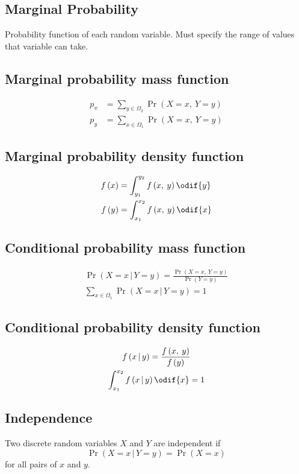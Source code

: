 \documentclass{article}
\begin{document}
\begin{multicols}{3}
    \subsection{Marginal Probability}
    Probability function of each random variable.
    Must specify the range of values that variable can take.
    \subsection{Marginal probability mass function}
    \begin{align*}
        p_x & = \sum_{y \in \Omega_2} \Pr{\left( X = x,\: Y = y \right)} \\
        p_y & = \sum_{x \in \Omega_1} \Pr{\left( X = x,\: Y = y \right)}
    \end{align*}
    \subsection{Marginal probability density function}
    \begin{align*}
        f\left( x \right) & = \int_{y_1}^{y_2} f\left( x,\: y \right) \odif{y} \\
        f\left( y \right) & = \int_{x_1}^{x_2} f\left( x,\: y \right) \odif{x}
    \end{align*}
    \subsection{Conditional probability mass function}
    \begin{gather*}
        \Pr{\left( X = x \,\vert\, Y = y \right)} = \frac{\Pr{\left( X = x,\: Y = y \right)}}{\Pr{\left( Y = y \right)}} \\
        \sum_{x \in \Omega_1} \Pr{\left( X = x \,\vert\, Y = y \right)} = 1
    \end{gather*}
    \subsection{Conditional probability density function}
    \begin{gather*}
        f\left( x \,\vert\, y \right) = \frac{f\left( x,\: y \right)}{f\left( y \right)} \\
        \int_{x_1}^{x_2} f\left( x \,\vert\, y \right) \odif{x} = 1
    \end{gather*}
    \subsection{Independence}
    Two discrete random variables \(X\) and \(Y\) are independent if
    \begin{equation*}
        \Pr{\left( X = x \,\vert\, Y = y \right)} = \Pr{\left( X = x \right)}
    \end{equation*}
    for all pairs of \(x\) and \(y\).


\end{multicols}
\end{document}
